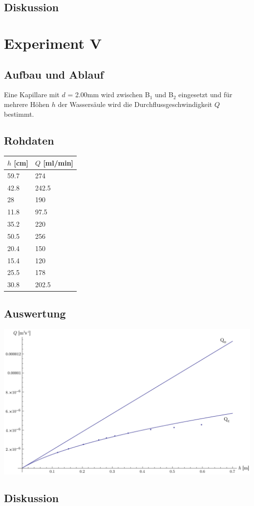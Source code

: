 \documentclass[12pt,a4paper]{article}
\newcommand{\subscript}[1]{$_{#1}$}
\newcommand{\B}[1]{B\subscript{#1}}
\begin{document}
\subsection*{Diskussion}


\section*{Experiment V}

\subsection*{Aufbau und Ablauf}
Eine Kapillare mit $d$ = 2.00mm wird zwischen \B{1} und \B{2} eingesetzt und f\"ur mehrere H\"ohen $h$ der Wassers\"aule wird die Durchflussgeschwindigkeit $Q$ bestimmt.

\subsection*{Rohdaten}
\begin{tabular}{|l|l|}
\hline
$h$ [cm]&$Q$ [ml/min]\\
\hline
59.7&274\\
42.8&242.5\\
28&190\\
11.8&97.5\\
35.2&220\\
50.5&256\\
20.4&150\\
15.4&120\\
25.5&178\\
30.8&202.5\\
\hline
\end{tabular}

\subsection*{Auswertung}
\begin{center}
\includegraphics[width=15cm]{diagram5.pdf}
\end{center}

\subsection*{Diskussion}
\end{document}
